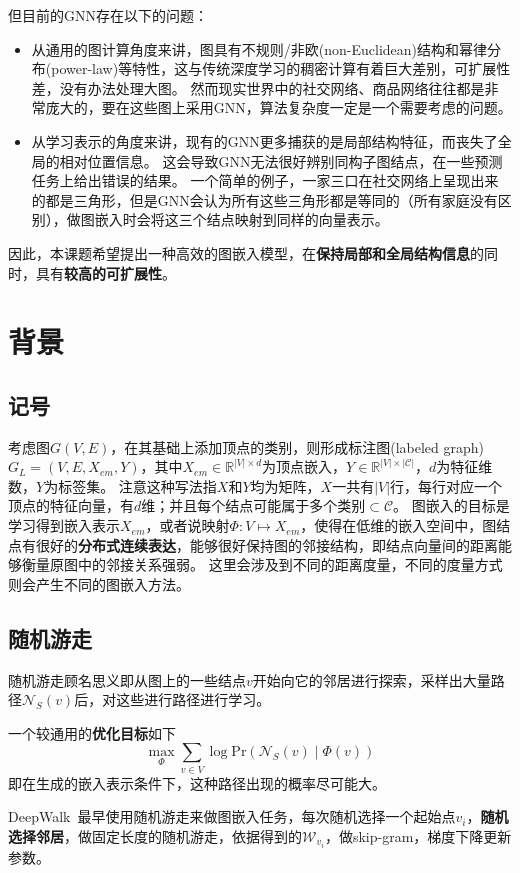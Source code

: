 \documentclass[reportComp]{thesis}
\begin{document}
但目前的GNN存在以下的问题：
\begin{itemize}
\item 从通用的图计算角度来讲，图具有不规则/非欧(non-Euclidean)结构和幂律分布(power-law)等特性，这与传统深度学习的稠密计算有着巨大差别，可扩展性差，没有办法处理大图。
然而现实世界中的社交网络、商品网络往往都是非常庞大的，要在这些图上采用GNN，算法复杂度一定是一个需要考虑的问题。
\item 从学习表示的角度来讲，现有的GNN更多捕获的是局部结构特征，而丧失了全局的相对位置信息。
这会导致GNN无法很好辨别同构子图结点，在一些预测任务上给出错误的结果。
一个简单的例子，一家三口在社交网络上呈现出来的都是三角形，但是GNN会认为所有这些三角形都是等同的（所有家庭没有区别），做图嵌入时会将这三个结点映射到同样的向量表示。
\end{itemize}

因此，本课题希望提出一种高效的图嵌入模型，在\textbf{保持局部和全局结构信息}的同时，具有\textbf{较高的可扩展性}。

\section{背景}
\subsection{记号}
考虑图$G(V,E)$，在其基础上添加顶点的类别，则形成标注图(labeled graph)$G_L=(V,E,X_{em},Y)$，其中$X_{em}\in\mathbb{R}^{|V|\times d}$为顶点嵌入，$Y\in\mathbb{R}^{|V|\times |\mathcal{C}|}$，$d$为特征维数，$Y$为标签集。
注意这种写法指$X$和$Y$均为矩阵，$X$一共有$|V|$行，每行对应一个顶点的特征向量，有$d$维；并且每个结点可能属于多个类别$\subset \mathcal{C}$。
图嵌入的目标是学习得到嵌入表示$X_{em}$，或者说映射$\Phi:V\mapsto X_{em}$，使得在低维的嵌入空间中，图结点有很好的\textbf{分布式连续表达}，能够很好保持图的邻接结构，即结点向量间的距离能够衡量原图中的邻接关系强弱。
这里会涉及到不同的距离度量，不同的度量方式则会产生不同的图嵌入方法。

\subsection{随机游走}
随机游走顾名思义即从图上的一些结点$v$开始向它的邻居进行探索，采样出大量路径$\mathcal{N}_S(v)$后，对这些进行路径进行学习。

一个较通用的\textbf{优化目标}如下
\[\max_\Phi\sum_{v\in V}\log\mathrm{Pr}(\mathcal{N}_S(v)\mid \Phi(v))\]
即在生成的嵌入表示条件下，这种路径出现的概率尽可能大。

DeepWalk~\cite{perozzi:deepwalk_kdd_2014}最早使用随机游走来做图嵌入任务，每次随机选择一个起始点$v_i$，\textbf{随机选择邻居}，做固定长度的随机游走，依据得到的$\mathcal{W}_{v_i}$，做skip-gram，梯度下降更新参数。
\end{document}
